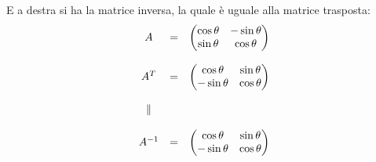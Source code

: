 \documentclass[a4paper]{article}
\makeatletter
\newenvironment{rowequmat}[1]{\left(\array{@{}#1@{}}}{\endarray\right)}
\makeatother
\begin{document}
	E a destra si ha la matrice inversa, la quale è uguale alla matrice trasposta:
	\begin{equation*}
		\begin{array}{cll}
			A & = & \begin{rowequmat}{cc}
				\cos\theta & -\sin\theta \\
				\sin\theta & \cos\theta
			\end{rowequmat} \\
			\\
			A^{T} & = & \begin{rowequmat}{cc}
				\cos\theta & \sin\theta \\
				-\sin\theta & \cos\theta
			\end{rowequmat} \\
			\\
			\parallel & & \\
			\\
			A^{-1} & = & \begin{rowequmat}{cc}
				\cos\theta & \sin\theta \\
				-\sin\theta & \cos\theta
			\end{rowequmat}
		\end{array}
	\end{equation*}
\end{document}
